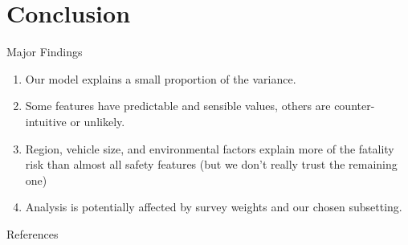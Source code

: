 \documentclass{beamer}
\begin{document}
\section{Conclusion}

\begin{frame}{Major Findings}

\begin{enumerate}
    \item Our model explains a small proportion of the variance.
    \item Some features have predictable and sensible values, others are counter-intuitive or unlikely.
    \item Region, vehicle size, and environmental factors explain more of the fatality
    risk than almost all safety features (but we don't really trust the remaining one)
    \item Analysis is potentially affected by survey weights and our chosen subsetting.
\end{enumerate}

\end{frame}

\begin{frame}[allowframebreaks]{References}


\printbibliography
    
\end{frame}
\end{document}
